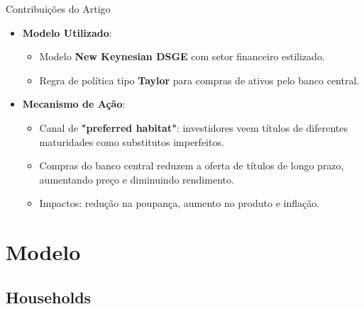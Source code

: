 \documentclass{beamer}
\begin{document}
\begin{frame}{Contribuições do Artigo}
    \begin{itemize}
        \item \textbf{Modelo Utilizado}:
        \begin{itemize}
            \item Modelo \textbf{New Keynesian DSGE} com setor financeiro estilizado.
            \item Regra de política tipo \textbf{Taylor} para compras de ativos pelo banco central.
        \end{itemize}
        \item \textbf{Mecanismo de Ação}:
        \begin{itemize}
            \item Canal de \textbf{"preferred habitat"}: investidores veem títulos de diferentes maturidades como substitutos imperfeitos.
            \item Compras do banco central reduzem a oferta de títulos de longo prazo, aumentando preço e diminuindo rendimento.
            \item Impactos: redução na poupança, aumento no produto e inflação.
        \end{itemize}
       
        
    \end{itemize}
\end{frame}



\section{Modelo}

\subsection{Households}
\end{document}
